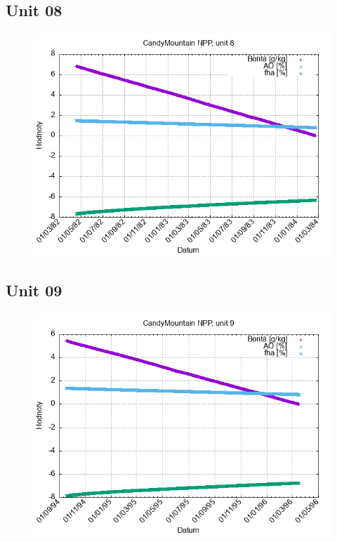 \documentclass{article}
\begin{document}
\subsection*{Unit 08}
\begin{figure}[h!]
\centering
\includegraphics[width=14cm]{./grafy/CandyMountain08.png}
\end{figure}
\clearpage
\subsection*{Unit 09}
\begin{figure}[h!]
\centering
\includegraphics[width=14cm]{./grafy/CandyMountain09.png}
\end{figure}
\clearpage
\end{document}
